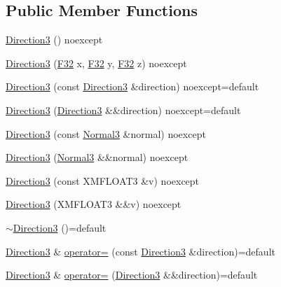 \subsection*{Public Member Functions}
\begin{DoxyCompactItemize}
\item 
\hyperlink{structmage_1_1_direction3_a1c3d06aa13b207f86df36f5f3cfe486a}{Direction3} () noexcept
\item 
\hyperlink{structmage_1_1_direction3_a1dbabfdd974f0c2e492ae3c291bdc479}{Direction3} (\hyperlink{namespacemage_aa97e833b45f06d60a0a9c4fc22ae02c0}{F32} x, \hyperlink{namespacemage_aa97e833b45f06d60a0a9c4fc22ae02c0}{F32} y, \hyperlink{namespacemage_aa97e833b45f06d60a0a9c4fc22ae02c0}{F32} z) noexcept
\item 
\hyperlink{structmage_1_1_direction3_acc17dc74c832499081124b706058d813}{Direction3} (const \hyperlink{structmage_1_1_direction3}{Direction3} \&direction) noexcept=default
\item 
\hyperlink{structmage_1_1_direction3_a3852489e86ad55937e50aa17b15ccd05}{Direction3} (\hyperlink{structmage_1_1_direction3}{Direction3} \&\&direction) noexcept=default
\item 
\hyperlink{structmage_1_1_direction3_a3f4daf4fbf2e873bcf9133eca22fad34}{Direction3} (const \hyperlink{structmage_1_1_normal3}{Normal3} \&normal) noexcept
\item 
\hyperlink{structmage_1_1_direction3_ae9b26ed667537e7751b495058bb71de0}{Direction3} (\hyperlink{structmage_1_1_normal3}{Normal3} \&\&normal) noexcept
\item 
\hyperlink{structmage_1_1_direction3_a1230915b5196dfb1f453a612837f2cce}{Direction3} (const X\+M\+F\+L\+O\+A\+T3 \&v) noexcept
\item 
\hyperlink{structmage_1_1_direction3_a93492f00127daa470f69afaa08603759}{Direction3} (X\+M\+F\+L\+O\+A\+T3 \&\&v) noexcept
\item 
\hyperlink{structmage_1_1_direction3_a583c087dc366d206aaf54a33bc90c50b}{$\sim$\+Direction3} ()=default
\item 
\hyperlink{structmage_1_1_direction3}{Direction3} \& \hyperlink{structmage_1_1_direction3_a474a3c1ecf07954ff598933cef4f85f4}{operator=} (const \hyperlink{structmage_1_1_direction3}{Direction3} \&direction)=default
\item 
\hyperlink{structmage_1_1_direction3}{Direction3} \& \hyperlink{structmage_1_1_direction3_aac5690f3f40ba12f4e9eb09f5d2fb7f7}{operator=} (\hyperlink{structmage_1_1_direction3}{Direction3} \&\&direction)=default
\end{DoxyCompactItemize}


